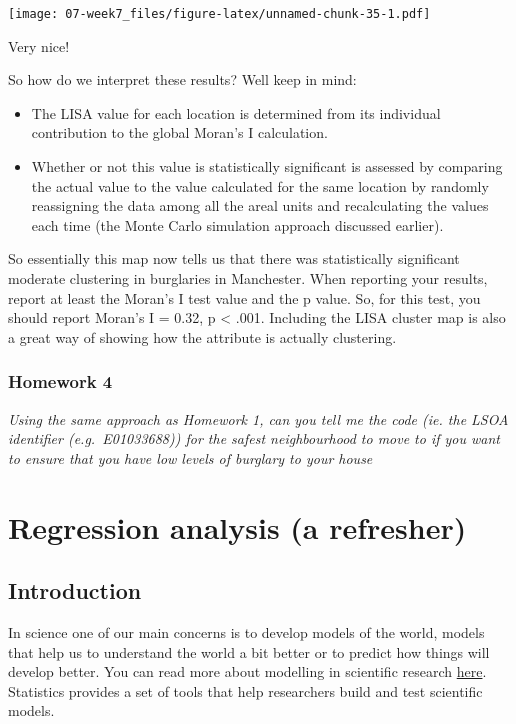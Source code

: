 \documentclass[]{book}
\providecommand{\tightlist}{%
  \setlength{\itemsep}{0pt}\setlength{\parskip}{0pt}}
\begin{document}
\texttt{[image: 07-week7\_files/figure-latex/unnamed-chunk-35-1.pdf]}

Very nice!

So how do we interpret these results? Well keep in mind:

\begin{itemize}
\tightlist
\item
  The LISA value for each location is determined from its individual contribution to the global Moran's I calculation.
\item
  Whether or not this value is statistically significant is assessed by comparing the actual value to the value calculated for the same location by randomly reassigning the data among all the areal units and recalculating the values each time (the Monte Carlo simulation approach discussed earlier).
\end{itemize}

So essentially this map now tells us that there was statistically significant moderate clustering in burglaries in Manchester. When reporting your results, report at least the Moran's I test value and the p value. So, for this test, you should report Moran's I = 0.32, p \textless{} .001. Including the LISA cluster map is also a great way of showing how the attribute is actually clustering.

\hypertarget{homework-4}{%
\subsection{Homework 4}\label{homework-4}}

\emph{Using the same approach as Homework 1, can you tell me the code (ie. the LSOA identifier (e.g.~E01033688)) for the safest neighbourhood to move to if you want to ensure that you have low levels of burglary to your house}

\hypertarget{regression-analysis-a-refresher}{%
\chapter{Regression analysis (a refresher)}\label{regression-analysis-a-refresher}}

\hypertarget{introduction-2}{%
\section{Introduction}\label{introduction-2}}

In science one of our main concerns is to develop models of the world, models that help us to understand the world a bit better or to predict how things will develop better. You can read more about modelling in scientific research \href{https://www.visionlearning.com/en/library/Process-of-Science/49/Modeling-in-Scientific-Research/153}{here}. Statistics provides a set of tools that help researchers build and test scientific models.
\end{document}
